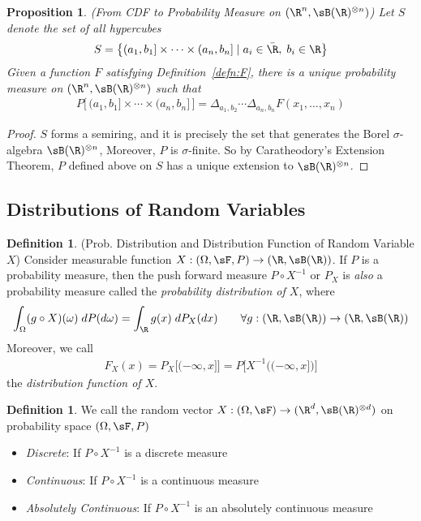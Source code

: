 \documentclass[12pt]{article}
\theoremstyle{plain}
\newtheorem{prop}[thm]{Proposition}
\theoremstyle{definition}
\newtheorem{defn}[thm]{Definition}
\theoremstyle{remark}
\newcommand{\ra}{\rightarrow}
\begin{document}
\begin{prop}
\emph{(From CDF to Probability Measure on $(\R^n,\sB(\R)^{\otimes n})$)}
Let $S$ denote the set of all hypercubes
\begin{align*}
  S = \left\{ (a_1,b_1]\times\cdots\times(a_n,b_n]
  \;|\; a_i\in\bar{\R}, \; b_i\in\R\right\}
\end{align*}
Given a function $F$ satisfying Definition~\ref{defn:F}, there is a
unique probability measure on $(\R^n,\sB(\R)^{\otimes n})$ such
that
\begin{align*}
  P\big[\, (a_1,b_1]\times\cdots\times(a_n,b_n] \,\big] =
  \Delta_{a_1,b_2}
  \cdots
  \Delta_{a_n,b_n}
  F(x_1,\ldots,x_n)
\end{align*}
\end{prop}
\begin{proof}
$S$ forms a semiring, and it is precisely the set that generates the
Borel $\sigma$-algebra $\sB(\R)^{\otimes n}$, Moreover, $P$ is
$\sigma$-finite. So by Caratheodory's Extension Theorem, $P$ defined
above on $S$ has a unique extension to $\sB(\R)^{\otimes n}$.
\end{proof}


\clearpage
\subsection{Distributions of Random Variables}


\begin{defn}(Prob. Distribution and Distribution Function of Random Variable $X$)
Consider measurable function $X:(\Omega,\sF,P)\ra (\R,\sB(\R))$.
If $P$ is a probability measure, then the push forward
measure $P \circ X^{-1}$ or $P_X$ is \emph{also} a probability measure
called the \emph{probability distribution of $X$}, where
\begin{align*}
  \int_\Omega (g\circ X)(\omega)\; dP(d\omega)
  = \int_\R g(x) \; dP_X(dx)
  \qquad \forall g:(\R,\sB(\R))\ra (\R,\sB(\R))
\end{align*}
Moreover, we call
\begin{align*}
  F_X(x)
  = P_X\big[(-\infty,x]\big]
  = P\big[X^{-1}\big((-\infty,x]\big)\big]
\end{align*}
the \emph{distribution function of $X$}.
\end{defn}

\begin{defn}
We call the random vector $X:(\Omega,\sF)\ra(\R^d,\sB(\R)^{\otimes d})$
on probability space $(\Omega,\sF,P)$
\begin{itemize}
  \item \emph{Discrete}: If $P\circ X^{-1}$ is a discrete measure
  \item \emph{Continuous}: If $P\circ X^{-1}$ is a continuous measure
  \item \emph{Absolutely Continuous}: If $P\circ X^{-1}$ is an
    absolutely continuous measure
\end{itemize}
\end{defn}
\end{document}
